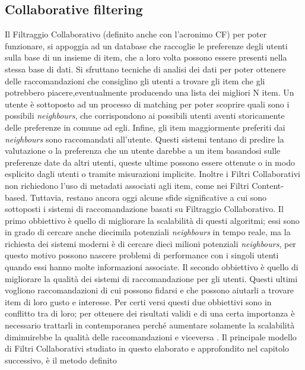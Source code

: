 \subsection{Collaborative filtering}
Il Filtraggio Collaborativo (definito anche con l'acronimo CF) per poter funzionare, si appoggia ad un database che raccoglie le 
preferenze degli utenti sulla base di un insieme di item, che a loro volta possono essere presenti nella stessa base di dati. 
Si sfruttano tecniche di analisi dei dati per poter ottenere delle raccomandazioni che consiglino gli utenti a trovare gli item 
che gli potrebbero piacere,eventualmente producendo una lista dei migliori N item.\hfill\break
Un utente è sottoposto ad un processo di matching per poter scoprire quali sono i possibili \textit{neighbours},
che corrispondono ai possibili utenti aventi storicamente delle preferenze in comune ad egli. Infine, gli item maggiormente 
preferiti dai \textit{neighbours} sono raccomandati all'utente.\hfill\break
Questi sistemi tentano di predire la valutazione o la preferenza che un utente darebbe a un item basandosi sulle preferenze date da altri 
utenti, queste ultime possono essere ottenute o in modo esplicito dagli utenti o tramite misurazioni implicite.
Inoltre i Filtri Collaborativi non richiedono l'uso di metadati associati agli item, come nei Filtri Content-based.\hfill\break
Tuttavia, restano ancora oggi alcune sfide significative a cui sono sottoposti i sistemi di raccomandazione basati su 
Filtraggio Collaborativo.\hfill\break
Il primo obbiettivo è quello di migliorare la scalabilità di questi algoritmi; essi sono in grado di cercare 
anche diecimila potenziali \textit{neighbours} in tempo reale, ma la richiesta dei sistemi moderni è di cercare dieci milioni 
potenziali \textit{neighbours}, per questo motivo possono nascere problemi di performance con i singoli utenti quando essi hanno 
molte informazioni associate.\hfill\break
Il secondo obbiettivo è quello di migliorare la qualità dei sistemi di raccomandazione per gli utenti. Questi ultimi vogliono 
raccomandazioni di cui possono fidarsi e che possono aiutarli a trovare item di loro gusto e interesse.
Per certi versi questi due obbiettivi sono in conflitto tra di loro; per ottenere dei risultati validi e di una certa importanza è 
necessario trattarli in contemporanea perché aumentare solamente la scalabilità diminuirebbe la qualità delle raccomandazioni e viceversa 
\cite{item-based-collaborative-filtering}.\hfill\break
Il principale modello di Filtri Collaborativi studiato in questo elaborato e approfondito nel capitolo successivo, è il metodo definito 
